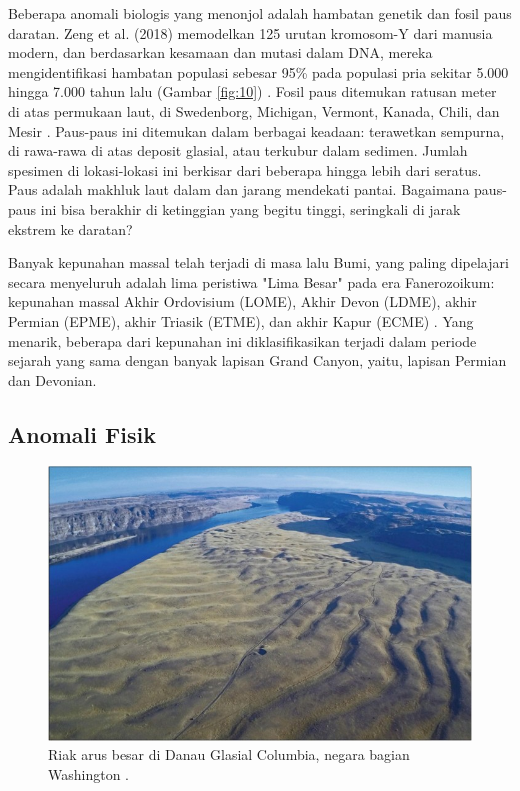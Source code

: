 \documentclass[10pt,twocolumn,letterpaper]{article}
\begin{document}
Beberapa anomali biologis yang menonjol adalah hambatan genetik dan fosil paus daratan. Zeng et al. (2018) memodelkan 125 urutan kromosom-Y dari manusia modern, dan berdasarkan kesamaan dan mutasi dalam DNA, mereka mengidentifikasi hambatan populasi sebesar 95\% pada populasi pria sekitar 5.000 hingga 7.000 tahun lalu (Gambar \ref{fig:10}) \cite{62}. Fosil paus ditemukan ratusan meter di atas permukaan laut, di Swedenborg, Michigan, Vermont, Kanada, Chili, dan Mesir \cite{63,64,65,66}. Paus-paus ini ditemukan dalam berbagai keadaan: terawetkan sempurna, di rawa-rawa di atas deposit glasial, atau terkubur dalam sedimen. Jumlah spesimen di lokasi-lokasi ini berkisar dari beberapa hingga lebih dari seratus. Paus adalah makhluk laut dalam dan jarang mendekati pantai. Bagaimana paus-paus ini bisa berakhir di ketinggian yang begitu tinggi, seringkali di jarak ekstrem ke daratan?

Banyak kepunahan massal telah terjadi di masa lalu Bumi, yang paling dipelajari secara menyeluruh adalah lima peristiwa "Lima Besar" pada era Fanerozoikum: kepunahan massal Akhir Ordovisium (LOME), Akhir Devon (LDME), akhir Permian (EPME), akhir Triasik (ETME), dan akhir Kapur (ECME) \cite{88,89}. Yang menarik, beberapa dari kepunahan ini diklasifikasikan terjadi dalam periode sejarah yang sama dengan banyak lapisan Grand Canyon, yaitu, lapisan Permian dan Devonian.

\subsection{Anomali Fisik}

\begin{figure}[b]
\begin{center}
   \includegraphics[width=1\linewidth]{columbia.jpg}
\end{center}
   \caption{Riak arus besar di Danau Glasial Columbia, negara bagian Washington \cite{80}.}
\label{fig:11}
\label{fig:onecol}
\end{figure}
\end{document}

